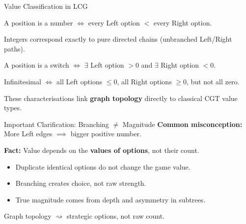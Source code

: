 \documentclass[10pt,aspectratio=169]{beamer}
\begin{document}
\begin{frame}{Value Classification in LCG}
  \begin{theorem}[Numbers]
    A position is a number $\iff$ every Left option $<$ every Right option.
  \end{theorem}

  \begin{theorem}[Integers]
    Integers correspond exactly to pure directed chains (unbranched Left/Right paths).
  \end{theorem}

  \begin{theorem}[Switches]
    A position is a switch $\iff$ $\exists$ Left option $>0$ and $\exists$ Right option $<0$.
  \end{theorem}

  \begin{theorem}[Infinitesimals]
    Infinitesimal $\iff$ all Left options $\le 0$, all Right options $\ge 0$, but not all zero.
  \end{theorem}

  \vspace{8pt}
  These characterisations link \textbf{graph topology} directly to classical CGT value types.
\end{frame}

\begin{frame}{Important Clarification: Branching $\neq$ Magnitude}
  \textbf{Common misconception:} More Left edges $\implies$ bigger positive number.

  \vspace{10pt}
  \textbf{Fact:} Value depends on the \textbf{values of options}, not their count.

  \begin{itemize}
    \item Duplicate identical options do not change the game value.
    \item Branching creates choice, not raw strength.
    \item True magnitude comes from depth and asymmetry in subtrees.
  \end{itemize}

  \vspace{10pt}
  \centering
  \Large Graph topology $\rightsquigarrow$ strategic options, not raw count.
\end{frame}
\end{document}
